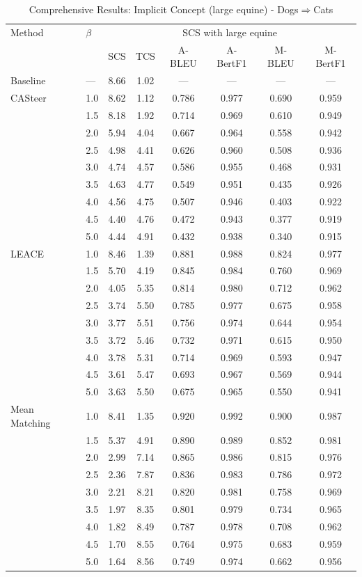 \begin{table}[htbp]
\centering
\caption{Comprehensive Results: Implicit Concept (large equine) - Dogs$\Rightarrow$Cats}
\label{tab:implicitconcept_large_equine_dogstocats}
\begin{tabular}{l|l|cccccc|}
\hline
Method & $\beta$ & \multicolumn{6}{c|}{SCS with large equine} \\
 &  & SCS & TCS & A-BLEU & A-BertF1 & M-BLEU & M-BertF1 \\
\hline
Baseline & — & 8.66 & 1.02 & — & — & — & — \\
\hline
CASteer & 1.0 & 8.62 & 1.12 & 0.786 & 0.977 & 0.690 & 0.959 \\
 & 1.5 & 8.18 & 1.92 & 0.714 & 0.969 & 0.610 & 0.949 \\
 & 2.0 & 5.94 & 4.04 & 0.667 & 0.964 & 0.558 & 0.942 \\
 & 2.5 & 4.98 & 4.41 & 0.626 & 0.960 & 0.508 & 0.936 \\
 & 3.0 & 4.74 & 4.57 & 0.586 & 0.955 & 0.468 & 0.931 \\
 & 3.5 & 4.63 & 4.77 & 0.549 & 0.951 & 0.435 & 0.926 \\
 & 4.0 & 4.56 & 4.75 & 0.507 & 0.946 & 0.403 & 0.922 \\
 & 4.5 & 4.40 & 4.76 & 0.472 & 0.943 & 0.377 & 0.919 \\
 & 5.0 & 4.44 & 4.91 & 0.432 & 0.938 & 0.340 & 0.915 \\
\hline
LEACE & 1.0 & 8.46 & 1.39 & 0.881 & 0.988 & 0.824 & 0.977 \\
 & 1.5 & 5.70 & 4.19 & 0.845 & 0.984 & 0.760 & 0.969 \\
 & 2.0 & 4.05 & 5.35 & 0.814 & 0.980 & 0.712 & 0.962 \\
 & 2.5 & 3.74 & 5.50 & 0.785 & 0.977 & 0.675 & 0.958 \\
 & 3.0 & 3.77 & 5.51 & 0.756 & 0.974 & 0.644 & 0.954 \\
 & 3.5 & 3.72 & 5.46 & 0.732 & 0.971 & 0.615 & 0.950 \\
 & 4.0 & 3.78 & 5.31 & 0.714 & 0.969 & 0.593 & 0.947 \\
 & 4.5 & 3.61 & 5.47 & 0.693 & 0.967 & 0.569 & 0.944 \\
 & 5.0 & 3.63 & 5.50 & 0.675 & 0.965 & 0.550 & 0.941 \\
\hline
Mean Matching & 1.0 & 8.41 & 1.35 & 0.920 & 0.992 & 0.900 & 0.987 \\
 & 1.5 & 5.37 & 4.91 & 0.890 & 0.989 & 0.852 & 0.981 \\
 & 2.0 & 2.99 & 7.14 & 0.865 & 0.986 & 0.815 & 0.976 \\
 & 2.5 & 2.36 & 7.87 & 0.836 & 0.983 & 0.786 & 0.972 \\
 & 3.0 & 2.21 & 8.21 & 0.820 & 0.981 & 0.758 & 0.969 \\
 & 3.5 & 1.97 & 8.35 & 0.801 & 0.979 & 0.734 & 0.965 \\
 & 4.0 & 1.82 & 8.49 & 0.787 & 0.978 & 0.708 & 0.962 \\
 & 4.5 & 1.70 & 8.55 & 0.764 & 0.975 & 0.683 & 0.959 \\
 & 5.0 & 1.64 & 8.56 & 0.749 & 0.974 & 0.662 & 0.956 \\
\hline
\end{tabular}
\end{table}

